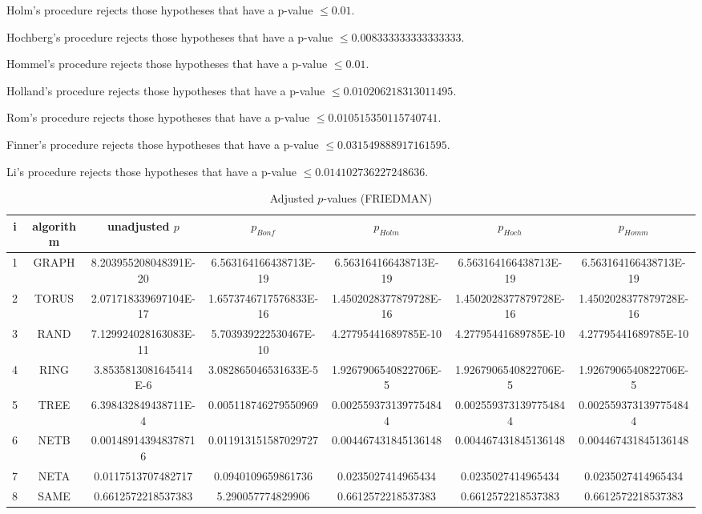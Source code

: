 \documentclass[a4paper,10pt]{article}
\begin{document}
\begin{landscape}
Holm's procedure rejects those hypotheses that have a p-value $\le0.01$.


Hochberg's procedure rejects those hypotheses that have a p-value $\le0.008333333333333333$.


Hommel's procedure rejects those hypotheses that have a p-value $\le0.01$.


Holland's procedure rejects those hypotheses that have a p-value $\le0.010206218313011495$.


Rom's procedure rejects those hypotheses that have a p-value $\le0.010515350115740741$.


Finner's procedure rejects those hypotheses that have a p-value $\le0.031549888917161595$.


Li's procedure rejects those hypotheses that have a p-value $\le0.014102736227248636$.



\newpage

\begin{table}[!htp]
\centering\scriptsize
\caption{Adjusted $p$-values (FRIEDMAN)}
\begin{tabular}{ccccccc}
i&algorithm&unadjusted $p$&$p_{Bonf}$&$p_{Holm}$&$p_{Hoch}$&$p_{Homm}$\\
\hline
1& GRAPH&8.203955208048391E-20&6.563164166438713E-19&6.563164166438713E-19&6.563164166438713E-19&6.563164166438713E-19\\
2& TORUS&2.071718339697104E-17&1.6573746717576833E-16&1.4502028377879728E-16&1.4502028377879728E-16&1.4502028377879728E-16\\
3& RAND&7.129924028163083E-11&5.703939222530467E-10&4.27795441689785E-10&4.27795441689785E-10&4.27795441689785E-10\\
4& RING&3.8535813081645414E-6&3.082865046531633E-5&1.9267906540822706E-5&1.9267906540822706E-5&1.9267906540822706E-5\\
5& TREE&6.398432849438711E-4&0.005118746279550969&0.0025593731397754844&0.0025593731397754844&0.0025593731397754844\\
6& NETB&0.001489143948378716&0.011913151587029727&0.004467431845136148&0.004467431845136148&0.004467431845136148\\
7& NETA&0.0117513707482717&0.0940109659861736&0.0235027414965434&0.0235027414965434&0.0235027414965434\\
8& SAME&0.6612572218537383&5.290057774829906&0.6612572218537383&0.6612572218537383&0.6612572218537383\\
\hline
\end{tabular}
\end{table}


\end{landscape}
\end{document}

